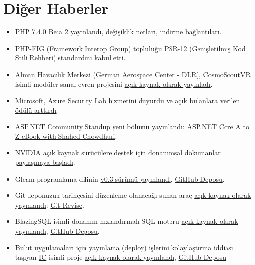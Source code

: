 \documentclass[11pt]{article}
\begin{document}
\section{Diğer Haberler}
\label{sec:org779b2aa}
\begin{itemize}
\item PHP 7.4.0 \href{https://www.php.net/archive/2019.php\#2019-08-08-1}{Beta 2 yayınlandı}, \href{https://github.com/php/php-src/blob/php-7.4.0beta2/NEWS}{değişiklik notları}, \href{https://downloads.php.net/\~derick/}{indirme bağlantıları}.
\item PHP-FIG (Framework Interop Group) topluluğu \href{https://github.com/php-fig/fig-standards/blob/master/accepted/PSR-12-extended-coding-style-guide.md}{PSR-12 (Genişletilmiş Kod Stili
Rehberi) standardını kabul etti}.
\item Alman Havacılık Merkezi (German Aerospace Center - DLR), CosmoScoutVR isimli
modüler sanal evren projesini \href{https://github.com/cosmoscout/cosmoscout-vr}{açık kaynak olarak yayınladı}.
\item Microsoft, Azure Security Lab hizmetini \href{https://venturebeat.com/2019/08/05/microsoft-launches-azure-security-lab-doubles-top-bug-bounty-to-40000/}{duyurdu ve açık bulanlara verilen
ödülü arttırdı}.
\item ASP.NET Community Standup yeni bölümü yayınlandı: \href{https://www.youtube.com/watch?v=t5sBSOydYxI}{ASP.NET Core A to Z eBook
with Shahed Chowdhuri}.
\item NVIDIA açık kaynak sürücülere destek için \href{https://www.phoronix.com/scan.php?page=news\_item\&px=NVIDIA-Open-GPU-Docs}{donanımsal dökümanlar paylaşmaya
başladı}.
\item Gleam programlama dilinin \href{https://lpil.uk/blog/gleam-v0.3-released/}{v0.3 sürümü yayınlandı}, \href{https://github.com/lpil/gleam}{GitHub Deposu}.
\item Git deponuzun tarihçesini düzenleme olanacağı sunan araç \href{https://mystor.github.io/git-revise.html}{açık kaynak olarak
yayınlandı}: \href{https://github.com/mystor/git-revise}{Git-Revise}.
\item BlazingSQL isimli donanım hızlandırmalı SQL motoru \href{https://blog.blazingdb.com/blazingsql-is-now-open-source-b859d342ec20}{açık kaynak olarak
yayınlandı}, \href{https://github.com/blazingdb/pyBlazing/}{GitHub Deposu}.
\item Bulut uygulamaları için yayınlama (deploy) işlerini kolaylaştırma iddiası
taşıyan \href{https://ic.dev/}{IC} isimli proje \href{https://medium.com/icdotdev/introducing-ic-b3eabf8bf120}{açık kaynak olarak yayınlandı}, \href{https://github.com/icdotdev/cli}{GitHub Deposu}.

\end{itemize}
\end{document}
